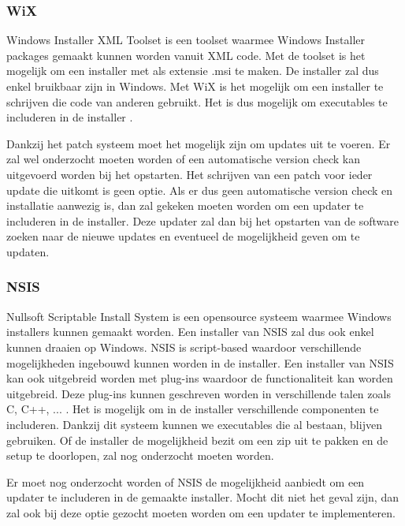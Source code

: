 \documentclass{article}
\begin{document}
\subsubsection{WiX \citep{wixMain}}
Windows Installer XML Toolset is een toolset waarmee Windows Installer packages gemaakt kunnen worden vanuit XML code.
Met de toolset is het mogelijk om een installer met als extensie .msi te maken.
De installer zal dus enkel bruikbaar zijn in Windows.
Met WiX is het mogelijk om een installer te schrijven die code van anderen gebruikt.
Het is dus mogelijk om executables te includeren in de installer \citep{wixMergers}.

Dankzij het patch systeem moet het mogelijk zijn om updates uit te voeren.
Er zal wel onderzocht moeten worden of een automatische version check kan uitgevoerd worden bij het opstarten.
Het schrijven van een patch voor ieder update die uitkomt is geen optie.
Als er dus geen automatische version check en installatie aanwezig is, dan zal gekeken moeten worden om een updater te includeren in de installer.
Deze updater zal dan bij het opstarten van de software zoeken naar de nieuwe updates en eventueel de mogelijkheid geven om te updaten.

\subsubsection{NSIS \citep{nsisMain}}
Nullsoft Scriptable Install System is een opensource systeem waarmee Windows installers kunnen gemaakt worden.
Een installer van NSIS zal dus ook enkel kunnen draaien op Windows.
NSIS is script-based waardoor verschillende mogelijkheden ingebouwd kunnen worden in de installer.
Een installer van NSIS kan ook uitgebreid worden met plug-ins waardoor de functionaliteit kan worden uitgebreid.
Deze plug-ins kunnen geschreven worden in verschillende talen zoals C, C++, ... \citep{nsisFeatures}.
Het is mogelijk om in de installer verschillende componenten te includeren.
Dankzij dit systeem kunnen we executables die al bestaan, blijven gebruiken.
Of de installer de mogelijkheid bezit om een zip uit te pakken en de setup te doorlopen, zal nog onderzocht moeten worden.

Er moet nog onderzocht worden of NSIS de mogelijkheid aanbiedt om een updater te includeren in de gemaakte installer.
Mocht dit niet het geval zijn, dan zal ook bij deze optie gezocht moeten worden om een updater te implementeren.
\end{document}
